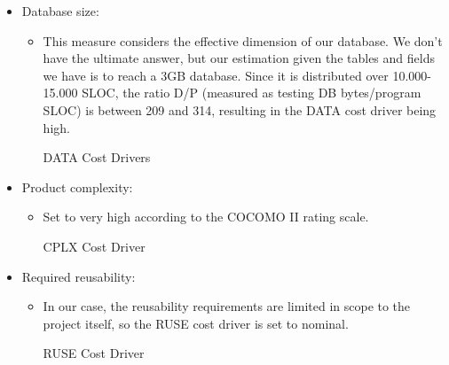 \begin{itemize}
	\item Database size:
	\begin{itemize}
	\item[] This measure considers the effective dimension of our database. We don't have the ultimate answer, but our estimation given the tables and fields we have is to reach a 3GB database. Since it is distributed over 10.000-15.000 SLOC, the ratio D/P (measured as testing DB bytes/program SLOC) is between 209 and 314, resulting in the DATA cost driver being high. 
	\begin{costdriverstable}{DATA Cost Drivers}
		\hline
	\end{costdriverstable}
	\end{itemize}
\end{itemize}

\begin{itemize}
	\item Product complexity: 
	\begin{itemize}
	\item[] Set to very high according to the COCOMO II rating scale.
	\begin{costdriverstable}{CPLX Cost Driver}
	\end{costdriverstable}
	\end{itemize}
\end{itemize}

\begin{itemize}
	\item Required reusability: 
	\begin{itemize}
	\item[] In our case, the reusability requirements are limited in scope to the project itself, so the RUSE cost driver is set to nominal.
	\begin{costdriverstable}{RUSE Cost Driver}
		\hline
	\end{costdriverstable}
	\end{itemize}
\end{itemize}

